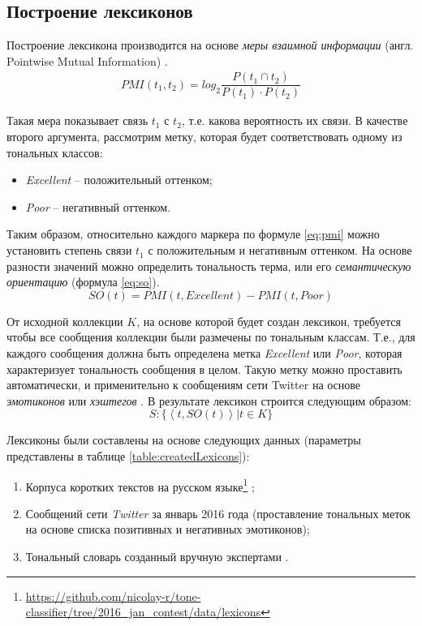 \subsection{Построение лексиконов}

Построение лексикона производится на основе {\it меры взаимной информации}
(англ. Pointwise Mutual Information) \cite{lexiconSO}.
\begin{gather}
    PMI(t_1, t_2) = log_2 \dfrac{P(t_1\cap t_2)}{P(t_1)\cdot P(t_2)}
    \label{eq:pmi}
\end{gather}

Такая мера показывает связь $t_1$ с $t_2$, т.е. какова вероятность их связи.
В качестве второго аргумента, рассмотрим метку, которая будет соответствовать
одному из тональных классов:
\begin{itemize}
    \item {\it Excellent} -- положительный оттенком;
    \item {\it Poor} -- негативный оттенком.
\end{itemize}

Таким образом, относительно каждого маркера по формуле \ref{eq:pmi} можно
установить степень связи $t_1$ с положительным и негативным оттенком.
На основе разности значений можно определить тональность терма, или его
{\it семантическую ориентацию} (формула \ref{eq:so}).
\begin{equation}
    \label{eq:so}
    SO(t) = PMI(t, Excellent) - PMI(t, Poor)
\end{equation}

От исходной коллекции $K$, на основе которой будет создан лексикон, требуется
чтобы все сообщения коллекции были размечены по тональным классам.
Т.е., для каждого сообщения должна быть определена метка {\it Excellent} или
{\it Poor}, которая характеризует тональность сообщения в целом.
Такую метку можно проставить автоматически, и применительно к сообщениям
сети Twitter на основе {\it эмотиконов} или {\it хэштегов} \cite{severyn}.
В результате лексикон строится следующим образом:
\begin{equation}
    S : \{ \left< t, SO(t) \right> | t \in K\}
\end{equation}


Лексиконы были составлены на основе следующих данных (параметры представлены
в таблице \ref{table:createdLexicons}):

\begin{enumerate}
    \item Корпуса коротких текстов на русском языке\footnote{
        \url{https://github.com/nicolay-r/tone-classifier/tree/2016_jan_contest/data/lexicons}
    } \cite{rubtsovaCollection};
    \item Сообщений сети {\it Twitter } за январь 2016 года (проставление тональных
        меток на основе списка позитивных и негативных эмотиконов);
    \item Тональный словарь созданный вручную экспертами \cite{expertLexicon}.
\end{enumerate}


